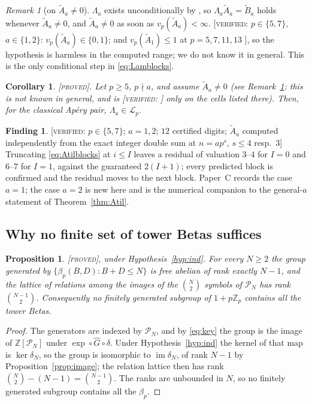 \documentclass[11pt,reqno]{article}
\newcommand{\Zp}{\mathbb{Z}_p}
\newcommand{\ZZ}{\mathbb{Z}}
\newcommand{\bet}{\beta_p}
\newcommand{\Atil}{\widetilde{A}}
\newcommand{\Btil}{\widetilde{B}}
\newcommand{\vp}{v_p}
\newcommand{\Pset}{\mathcal{P}}
\newcommand{\Lalg}{\mathcal{L}_p}
\DeclareMathOperator{\im}{im}
\newcommand{\PROVED}{{\normalfont\textsc{[proved]}}}
\newcommand{\VER}[1]{{\normalfont\textsc{[verified:} #1\textsc{]}}}
\theoremstyle{plain}
\newtheorem{proposition}[theorem]{Proposition}
\newtheorem{corollary}[theorem]{Corollary}
\theoremstyle{definition}
\newtheorem{finding}[theorem]{Finding}
\theoremstyle{remark}
\newtheorem{remark}[theorem]{Remark}
\numberwithin{equation}{section}
\begin{document}
\begin{remark}[on $\Atil_a\ne0$]\label{rem:Atilnonzero}
$\Lambda_a$ exists unconditionally by \cite[Thm.~2.4]{PaperC}, so
$\Lambda_a\Atil_a=\Btil_a$ holds whenever $\Atil_a\ne0$, and $\Atil_a\ne0$ as
soon as $\vp(\Atil_a)<\infty$.  \VER{$p\in\{5,7\}$, $a\in\{1,2\}$:
$\vp(\Atil_a)\in\{0,1\}$; and $\vp(\Atil_1)\le1$ at $p=5,7,11,13$
\cite[Tab.~16]{PaperC}}, so the hypothesis is harmless in the computed range;
we do not know it in general.  This is the only conditional step in
\eqref{eq:Lamblocks}.
\end{remark}

\begin{corollary}\label{cor:inL}
\PROVED.  Let $p\ge5$, $p\nmid a$, and assume $\Atil_a\ne0$ \textup{(}see
Remark~\textup{\ref{rem:Atilnonzero}}: this is not known in general, and is
\VER{} only on the cells listed there\textup{)}.  Then, for the classical
Ap\'ery pair, $\Lambda_a\in\Lalg$.
\end{corollary}

\begin{finding}\label{find:blocks}
\VER{$p\in\{5,7\}$; $a=1,2$; $12$ certified digits; $\Atil_a$ computed
independently from the exact integer double sum at $n=ap^s$, $s\le4$ resp.\ $3$}
Truncating \eqref{eq:Atilblocks} at $i\le I$ leaves a residual of valuation
$3$--$4$ for $I=0$ and $6$--$7$ for $I=1$, against the guaranteed $2(I+1)$; every
predicted block is confirmed and the residual moves to the next block.  Paper~C
records the case $a=1$; the case $a=2$ is new here and is the numerical
companion to the general-$a$ statement of Theorem~\ref{thm:Atil}.
\end{finding}

\subsection{Why no finite set of tower Betas suffices}

\begin{proposition}\label{prop:infinite}
\PROVED, under Hypothesis~\ref{hyp:ind}.  For every $N\ge2$ the group generated
by $\{\bet(B,D):B+D\le N\}$ is free abelian of rank exactly $N-1$, and the
lattice of relations among the images of the $\binom N2$ symbols of $\Pset_N$
has rank $\binom{N-1}{2}$.  Consequently no finitely generated subgroup of $1+p\Zp$
contains all the tower Betas.
\end{proposition}
\begin{proof}
The generators are indexed by $\Pset_N$, and by \eqref{eq:key} the group is the
image of $\ZZ[\Pset_N]$ under $\exp\circ\widehat G\circ\delta$.  Under
Hypothesis~\ref{hyp:ind} the kernel of that map is $\ker\delta_N$, so the group
is isomorphic to $\im\delta_N$, of rank $N-1$ by
Proposition~\ref{prop:image}; the relation lattice then has rank
$\binom N2-(N-1)=\binom{N-1}2$.  The ranks are unbounded in $N$, so no finitely
generated subgroup contains all the $\bet$.
\end{proof}
\end{document}
